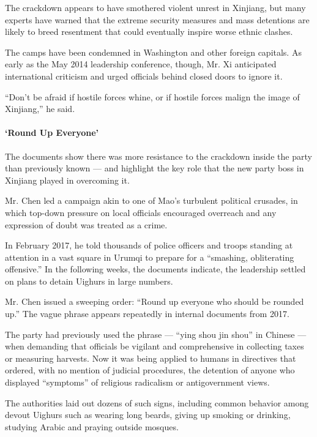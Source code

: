 The crackdown appears to have smothered violent unrest in Xinjiang, but
many experts have warned that the extreme security measures and mass
detentions are likely to breed resentment that could eventually inspire
worse ethnic clashes.

The camps have been condemned in Washington and other foreign capitals.
As early as the May 2014 leadership conference, though, Mr. Xi
anticipated international criticism and urged officials behind closed
doors to ignore it.

``Don't be afraid if hostile forces whine, or if hostile forces malign
the image of Xinjiang,'' he said.

\hypertarget{-round-up-everyone-}{%
\paragraph{ `Round Up Everyone' }\label{-round-up-everyone-}}

The documents show there was more resistance to the crackdown inside the
party than previously known --- and highlight the key role that the new
party boss in Xinjiang played in overcoming it.

Mr. Chen led a campaign akin to one of Mao's turbulent political
crusades, in which top-down pressure on local officials encouraged
overreach and any expression of doubt was treated as a crime.

In February 2017, he told thousands of police officers and troops
standing at attention in a vast square in Urumqi to prepare for a
``smashing, obliterating offensive.'' In the following weeks, the
documents indicate, the leadership settled on plans to detain Uighurs in
large numbers.

Mr. Chen issued a sweeping order: ``Round up everyone who should be
rounded up.'' The vague phrase appears repeatedly in internal documents
from 2017.

The party had previously used the phrase --- ``ying shou jin shou'' in
Chinese --- when demanding that officials be vigilant and comprehensive
in collecting taxes or measuring harvests. Now it was being applied to
humans in directives that ordered, with no mention of judicial
procedures, the detention of anyone who displayed ``symptoms'' of
religious radicalism or antigovernment views.

The authorities laid out dozens of such signs, including common behavior
among devout Uighurs such as wearing long beards, giving up smoking or
drinking, studying Arabic and praying outside mosques.

